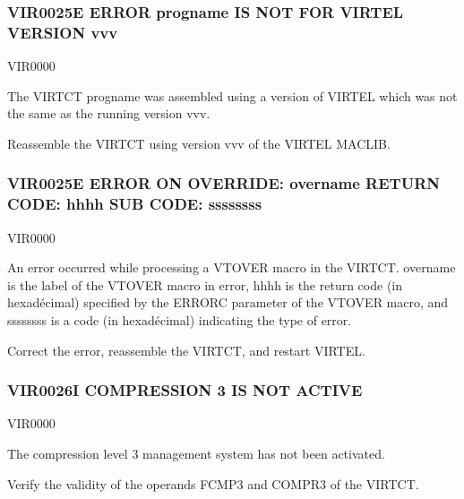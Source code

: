 \documentclass[letterpaper,10pt,english]{sphinxmanual}
\begin{document}
\subsubsection{VIR0025E ERROR progname IS NOT FOR VIRTEL VERSION vvv}
\label{\detokenize{messages:vir0025e-error-progname-is-not-for-virtel-version-vvv}}\begin{description}
\sphinxAtStartPar
VIR0000

\sphinxAtStartPar
The VIRTCT progname was assembled using a version of VIRTEL which was not the same as the running version vvv.

\sphinxAtStartPar
Re\sphinxhyphen{}assemble the VIRTCT using version vvv of the VIRTEL MACLIB.

\end{description}


\subsubsection{VIR0025E ERROR ON OVERRIDE: overname RETURN CODE: hhhh SUB CODE: ssssssss}
\label{\detokenize{messages:vir0025e-error-on-override-overname-return-code-hhhh-sub-code-ssssssss}}\begin{description}
\sphinxAtStartPar
VIR0000

\sphinxAtStartPar
An error occurred while processing a VTOVER macro in the VIRTCT.  overname is the label of the VTOVER macro       in error, hhhh is the return code (in hexadécimal) specified by the ERRORC parameter of the VTOVER macro, and ssssssss is a code (in hexadécimal) indicating the type of error.

\sphinxAtStartPar
Correct the error, re\sphinxhyphen{}assemble the VIRTCT, and restart VIRTEL.

\end{description}


\subsubsection{VIR0026I COMPRESSION 3 IS NOT ACTIVE}
\label{\detokenize{messages:vir0026i-compression-3-is-not-active}}\begin{description}
\sphinxAtStartPar
VIR0000

\sphinxAtStartPar
The compression level 3 management system has not been activated.

\sphinxAtStartPar
Verify the validity of the operands FCMP3 and COMPR3 of the VIRTCT.

\end{description}
\end{document}
